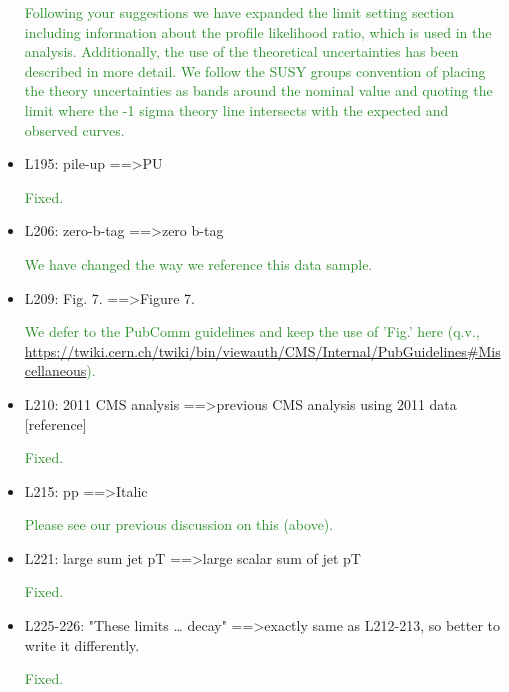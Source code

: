 \documentclass[paper=a4, fontsize=11pt]{scrartcl}
\begin{document}
\begin{itemize}
\textcolor{ForestGreen}{Following your suggestions we have expanded the limit setting
section including information about  the profile likelihood ratio, which is used in
the analysis. Additionally, the use of the theoretical uncertainties has been described
in more detail. We follow the SUSY groups convention of placing the theory uncertainties
as bands around the nominal value and quoting the limit where the -1 sigma theory line
intersects with the expected and observed curves.}\\

\item L195: 
pile-up ==\textgreater PU 

\textcolor{ForestGreen}{Fixed.}\\

\item L206: 
zero-b-tag ==\textgreater zero b-tag 

\textcolor{ForestGreen}{We have changed the way we reference this data sample.}\\


\item L209: 
Fig. 7. ==\textgreater Figure 7. 

\textcolor{ForestGreen}{We defer to the PubComm guidelines and keep the use of 'Fig.' here
(q.v., \url{https://twiki.cern.ch/twiki/bin/viewauth/CMS/Internal/PubGuidelines\#Miscellaneous}).}\\


\item L210: 
2011 CMS analysis ==\textgreater previous CMS analysis using 2011 data [reference] 

\textcolor{ForestGreen}{Fixed.}\\


\item L215: 
pp ==\textgreater Italic 

\textcolor{ForestGreen}{Please see our previous discussion on this (above).}\\

\item L221: 
large sum jet pT ==\textgreater large scalar sum of jet pT 

\textcolor{ForestGreen}{Fixed.}\\

\item L225-226: 
"These limits … decay" ==\textgreater exactly same as L212-213, so better to write it 
differently. 

\textcolor{ForestGreen}{Fixed.}\\



\end{itemize}
\end{document}
